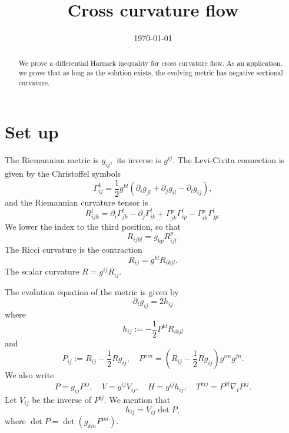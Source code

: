 \documentclass{amsart}
\theoremstyle{definition}
\theoremstyle{remark}
\numberwithin{equation}{section}
\begin{document}
\title[Cross curvature flow]
 {Cross curvature flow}

\curraddr{}
\email{}
\date{\today}

\dedicatory{}
\subjclass[2010]{}
\keywords{}

\begin{abstract}
We prove a differential Harnack inequality for cross curvature flow. As an application, we prove that as long as the solution exists, the evolving metric has negative sectional curvature.
\end{abstract}

\maketitle

\section{Set up}
The Riemannian metric is $g_{ij},$ its inverse is $g^{ij}$. The Levi-Civita connection is given by the Christoffel symbols
\begin{equation}
\Gamma_{ij}^k=\frac{1}{2}g^{kl}\left(\partial_ig_{jl}+\partial_jg_{il}-\partial_lg_{ij}\right),
\end{equation}
and the Riemannian curvature tensor is
\begin{equation}
R_{ijk}^l=\partial_i\Gamma_{jk}^l-\partial_j\Gamma_{ik}^l+\Gamma_{jk}^p\Gamma_{ip}^l-\Gamma_{ik}^p\Gamma_{jp}^l.
\end{equation}
We lower the index to the third position, so that
\begin{equation}
R_{ijkl}=g_{kp}R_{ijl}^p.
\end{equation}
The Ricci curvature is the contraction
\begin{equation}
R_{ij}=g^{kl}R_{ikjl}.
\end{equation}
The scalar curvature $R=g^{ij}R_{ij}.$

The evolution equation of the metric is given by
\begin{equation}
\partial_tg_{ij}=2h_{ij}
\end{equation}
where
\begin{equation}
h_{ij}:=-\frac{1}{2}P^{kl}R_{ikjl}
\end{equation}
and
\begin{equation}
P_{ij}:=R_{ij}-\frac{1}{2}Rg_{ij},\quad
P^{mn}=\left(R_{ij}-\frac{1}{2}Rg_{ij}\right)g^{im}g^{jn}.
\end{equation}
We also write
\begin{equation}
P=g_{ij}P^{ij},\quad V=g^{ij}V_{ij},\quad H=g^{ij}h_{ij},\quad  T^{kij}=P^{kl}\nabla_l P^{ij}.
\end{equation}
Let $V_{ij}$ be the inverse of $P^{ij}$. We mention that
\begin{equation}
h_{ij}=V_{ij}\det P,
\end{equation}
where $\det P = \det (g_{km} P^{ml}).$
\end{document}

